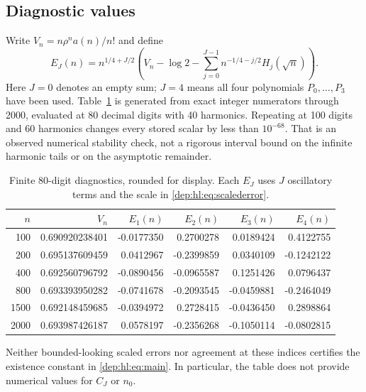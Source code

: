 \documentclass[11pt]{article}
\theoremstyle{definition}\newtheorem{definition}[theorem]{Definition}
\theoremstyle{remark}\newtheorem{remark}[theorem]{Remark}
\begin{document}
\subsection{Diagnostic values}
Write $V_n=n\rho^na(n)/n!$ and define
\begin{equation}\label{dep:hl:eq:scalederror}
 E_J(n)=n^{1/4+J/2}\left(V_n-\log 2-
    \sum_{j=0}^{J-1}n^{-1/4-j/2}H_j(\sqrt n)\right).
\end{equation}
Here $J=0$ denotes an empty sum; $J=4$ means all four polynomials
$P_0,\ldots,P_3$ have been used. Table~\ref{dep:hl:tab:diag} is generated
from exact integer numerators through 2000, evaluated at 80 decimal
digits with 40 harmonics. Repeating at 100 digits and 60 harmonics
changes every stored scalar by less than $10^{-68}$. That is an
observed numerical stability check, not a rigorous interval bound on
the infinite harmonic tails or on the asymptotic remainder.
\begin{table}[htbp]
\centering\small
\begin{tabular}{rrrrrr}
\toprule
$n$ & $V_n$ & $E_1(n)$ & $E_2(n)$ & $E_3(n)$ & $E_4(n)$ \\
\midrule
100 & 0.690920238401 & -0.0177350 & 0.2700278 & 0.0189424 & 0.4122755 \\
200 & 0.695137609459 & 0.0412967 & -0.2399859 & 0.0340109 & -0.1242122 \\
400 & 0.692560796792 & -0.0890456 & -0.0965587 & 0.1251426 & 0.0796437 \\
800 & 0.693393950282 & -0.0741678 & -0.2093545 & -0.0459881 & -0.2464049 \\
1500 & 0.692148459685 & -0.0394972 & 0.2728415 & -0.0436450 & 0.2898864 \\
2000 & 0.693987426187 & 0.0578197 & -0.2356268 & -0.1050114 & -0.0802815 \\
\bottomrule
\end{tabular}
\caption{Finite 80-digit diagnostics, rounded for display. Each $E_J$ uses $J$ oscillatory terms and the scale in \eqref{dep:hl:eq:scalederror}.}
\label{dep:hl:tab:diag}
\end{table}
Neither bounded-looking scaled errors nor agreement at these indices
certifies the existence constant in \eqref{dep:hl:eq:main}. In particular,
the table does not provide numerical values for $C_J$ or $n_0$.
\end{document}
